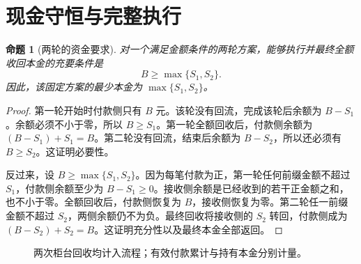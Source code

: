\documentclass[UTF8,a4paper]{ctexbook}
\newtheorem{proposition}[theorem]{命题}
\theoremstyle{definition}
\numberwithin{equation}{chapter}
\newcommand{\1}{\mathbf{1}}
\begin{document}
\section{现金守恒与完整执行}
\begin{proposition}[两轮的资金要求]\label{model:two-loads}
对一个满足金额条件的两轮方案，能够执行并最终全额收回本金的充要条件是
\begin{equation}\label{model:budget-max}
B\ge\max\{S_1,S_2\}.
\end{equation}
因此，该固定方案的最少本金为 $\max\{S_1,S_2\}$。
\end{proposition}
\begin{proof}
第一轮开始时付款侧只有 $B$ 元。该轮没有回流，完成该轮后余额为 $B-S_1$。余额必须不小于零，所以 $B\ge S_1$。第一轮全额回收后，付款侧余额为 $(B-S_1)+S_1=B$。第二轮没有回流，结束后余额为 $B-S_2$，所以还必须有 $B\ge S_2$。这证明必要性。

反过来，设 $B\ge\max\{S_1,S_2\}$。因为每笔付款为正，第一轮任何前缀金额不超过 $S_1$，付款侧余额至少为 $B-S_1\ge0$。接收侧余额是已经收到的若干正金额之和，也不小于零。全额回收后，付款侧恢复为 $B$，接收侧恢复为零。第二轮任一前缀金额不超过 $S_2$，两侧余额仍不为负。最终回收将接收侧的 $S_2$ 转回，付款侧成为 $(B-S_2)+S_2=B$。这证明充分性以及最终本金全部返回。
\end{proof}

\begin{figure}[htbp]
\centering
{}
\caption{两次柜台回收均计入流程；有效付款累计与持有本金分别计量。}
\label{model:cash-figure}
\end{figure}
\end{document}
